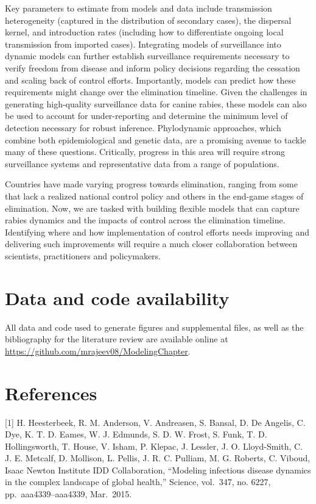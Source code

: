 \documentclass[
  oneside]{book}
\begin{document}
Key parameters to estimate from models and data include transmission
heterogeneity (captured in the distribution of secondary cases), the
dispersal kernel, and introduction rates (including how to differentiate
ongoing local transmission from imported cases). Integrating models of
surveillance into dynamic models can further establish surveillance
requirements necessary to verify freedom from disease and inform policy
decisions regarding the cessation and scaling back of control efforts.
Importantly, models can predict how these requirements might change over
the elimination timeline. Given the challenges in generating
high-quality surveillance data for canine rabies, these models can also
be used to account for under-reporting and determine the minimum level of
detection necessary for robust inference. Phylodynamic approaches, which
combine both epidemiological and genetic data, are a promising avenue to
tackle many of these questions. Critically, progress in this area will
require strong surveillance systems and representative data from a range
of populations.

Countries have made varying progress towards elimination, ranging from
some that lack a realized national control policy and others in the
end-game stages of elimination. Now, we are tasked with building
flexible models that can capture rabies dynamics and the impacts of
control across the elimination timeline. Identifying where and how
implementation of control efforts needs improving and delivering such
improvements will require a much closer collaboration between
scientists, practitioners and policymakers.

\hypertarget{data-and-code-availability}{%
\section{Data and code availability}\label{data-and-code-availability}}

All data and code used to generate figures and supplemental files, as
well as the bibliography for the literature review are available online
at \url{https://github.com/mrajeev08/ModelingChapter}.

\hypertarget{references-3}{%
\section{References}\label{references-3}}

\setlength{\parskip}{1em}

{[}1{]} H. Heesterbeek, R. M. Anderson, V. Andreasen, S. Bansal, D. De Angelis, C. Dye, K. T. D. Eames, W. J. Edmunds, S. D. W. Frost, S. Funk, T. D. Hollingsworth, T. House, V. Isham, P. Klepac, J. Lessler, J. O. Lloyd-Smith, C. J. E. Metcalf, D. Mollison, L. Pellis, J. R. C. Pulliam, M. G. Roberts, C. Viboud, Isaac Newton Institute IDD Collaboration, ``Modeling infectious disease dynamics in the complex landscape of global health,'' Science, vol.~347, no. 6227, pp.~aaa4339--aaa4339, Mar.~2015.
\end{document}
